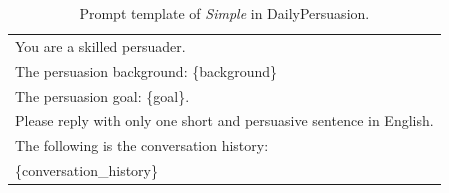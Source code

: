 \begin{table}[ht]
    \centering
    \footnotesize
    \begin{tabular}{p{15cm}}
        \toprule
        You are a skilled persuader. \\
        The persuasion background: \{background\} \\
        The persuasion goal: \{goal\}. \\
        Please reply with only one short and persuasive sentence in English. \\
        The following is the conversation history:  \\
        \{conversation\_history\} \\
        \bottomrule
    \end{tabular}
    \centering
    \caption{Prompt template of \textit{Simple} in DailyPersuasion.}
    \label{tab:simple-dailey-persuasion}
\end{table}